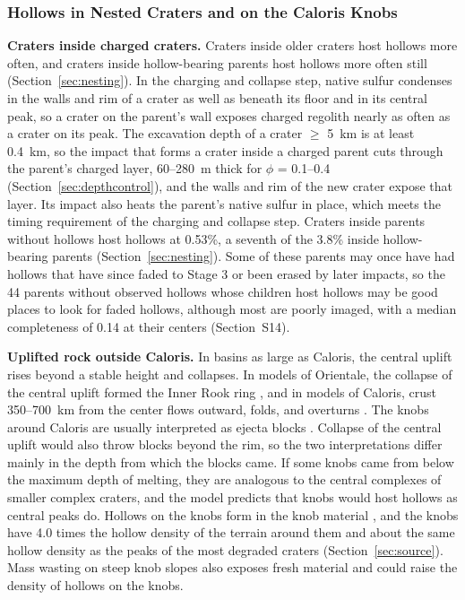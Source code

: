 \documentclass[article,review]{planetary}
\begin{document}
\begin{figure}[!htbp]
    \label{fig:lifecycle}
\end{figure}
\FloatBarrier

\subsubsection{Hollows in Nested Craters and on the Caloris Knobs}

\textbf{Craters inside charged craters.} Craters inside older craters host hollows more often, and craters inside hollow-bearing parents host hollows more often still (Section~\ref{sec:nesting}). In the charging and collapse step, native sulfur condenses in the walls and rim of a crater as well as beneath its floor and in its central peak, so a crater on the parent's wall exposes charged regolith nearly as often as a crater on its peak. The excavation depth of a crater $\geq$ 5~km is at least 0.4~km, so the impact that forms a crater inside a charged parent cuts through the parent's charged layer, 60--280~m thick for $\phi$ = 0.1--0.4 (Section~\ref{sec:depthcontrol}), and the walls and rim of the new crater expose that layer. Its impact also heats the parent's native sulfur in place, which meets the timing requirement of the charging and collapse step. Craters inside parents without hollows host hollows at 0.53\%, a seventh of the 3.8\% inside hollow-bearing parents (Section~\ref{sec:nesting}). Some of these parents may once have had hollows that have since faded to Stage 3 or been erased by later impacts, so the 44 parents without observed hollows whose children host hollows may be good places to look for faded hollows, although most are poorly imaged, with a median completeness of 0.14 at their centers (Section~S14).

\textbf{Uplifted rock outside Caloris.} In basins as large as Caloris, the central uplift rises beyond a stable height and collapses. In models of Orientale, the collapse of the central uplift formed the Inner Rook ring \parencite{johnsonFormationOrientaleLunar2016}, and in models of Caloris, crust 350--700~km from the center flows outward, folds, and overturns \parencite{gosselinCrustalBlockMuted2023}. The knobs around Caloris are usually interpreted as ejecta blocks \parencite{fassett2009,ackissKnobHeightsCircumCaloris2015}. Collapse of the central uplift would also throw blocks beyond the rim, so the two interpretations differ mainly in the depth from which the blocks came. If some knobs came from below the maximum depth of melting, they are analogous to the central complexes of smaller complex craters, and the model predicts that knobs would host hollows as central peaks do. Hollows on the knobs form in the knob material \parencite{wright2020}, and the knobs have 4.0 times the hollow density of the terrain around them and about the same hollow density as the peaks of the most degraded craters (Section~\ref{sec:source}). Mass wasting on steep knob slopes also exposes fresh material \parencite{wright2020} and could raise the density of hollows on the knobs.
\end{document}
